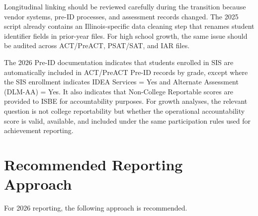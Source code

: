 \documentclass[11pt]{article}
\begin{document}
Longitudinal linking should be reviewed carefully during the transition because vendor systems, pre-ID processes, and assessment records changed. The 2025 script already contains an Illinois-specific data cleaning step that renames student identifier fields in prior-year files. For high school growth, the same issue should be audited across ACT/PreACT, PSAT/SAT, and IAR files.

The 2026 Pre-ID documentation indicates that students enrolled in SIS are automatically included in ACT/PreACT Pre-ID records by grade, except where the SIS enrollment indicates IDEA Services = Yes and Alternate Assessment (DLM-AA) = Yes. It also indicates that Non-College Reportable scores are provided to ISBE for accountability purposes. For growth analyses, the relevant question is not college reportability but whether the operational accountability score is valid, available, and included under the same participation rules used for achievement reporting.

\section{Recommended Reporting Approach}

For 2026 reporting, the following approach is recommended.
\end{document}
